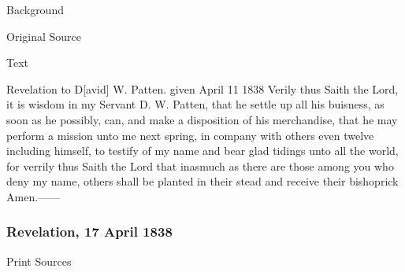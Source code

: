				\begin{description}
					\item[Background]
				\end{description}
				
				
				\begin{description}
					\item[Original Source]
				\end{description}
				
				
				\begin{description}
					\item[Text]
				\end{description}
				
					Revelation to D[avid] W. Patten. given April 11 1838 Verily thus Saith the Lord, it is wisdom in my Servant D. W. Patten, that he settle up all his buisness, as soon as he possibly, can, and make a disposition of his merchandise, that he may perform a mission unto me next spring, in company with others even twelve including himself, to testify of my name and bear glad tidings unto all the world, for verrily thus Saith the Lord that inasmuch as there are those among you who deny my name, others shall be planted in their stead and receive their bishoprick Amen.------
					
		\subsubsection{Revelation, 17 April 1838}
			\label{EMS-1838-JS-17-APR-1838}
			
			\begin{description}
					\item[Print Sources]
				\end{description}

